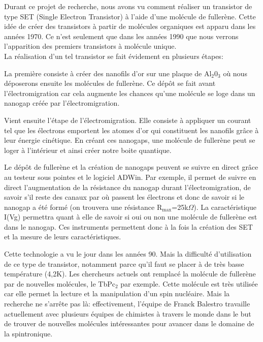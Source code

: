 Durant ce projet de recherche, nous avons vu comment réaliser un transistor de type SET (Single Electron Transistor) à l'aide d'une molécule de fullerène. Cette idée de créer des transistors à partir de molécules organiques est apparu dans les années 1970. Ce n'est seulement que dans les années 1990 que nous verrons l'apparition des premiers transistors à molécule unique.\\

La réalisation d'un tel transistor se fait évidement en plusieurs étapes:

La première consiste à créer des nanofils d'or sur une plaque de Al$_2$0$_3$ où nous déposerons ensuite les molécules de fullerène. Ce dépôt se fait avant l'électromigration car cela augmente les chances qu'une molécule se loge dans un nanogap créée par l'électromigration.

Vient ensuite l'étape de l'électromigration. Elle consiste à appliquer un courant tel que les électrons emportent les atomes d'or qui constituent les nanofils grâce à leur énergie cinétique. En créant ces nanogaps, une molécule de fullerène peut se loger à l'intérieur et ainsi créer notre boite quantique. 

Le dépôt de fullerène et la création de nanogaps peuvent se suivre en direct grâce au testeur sous pointes et le logiciel ADWin. Par exemple, il permet de suivre en direct l'augmentation de la résistance du nanogap durant l'électromigration, de savoir s'il reste des canaux par où passent les électrons et donc de savoir si le nanogap a été formé (on trouvera une résistance R$_\text{max}$=25k$\Omega$). La caractéristique I(Vg) permettra quant à elle de savoir si oui ou non une molécule de fullerène est dans le nanogap. Ces instruments permettent donc à la fois la création des SET et la mesure de leurs caractéristiques.

Cette technologie a vu le jour dans les années 90. Mais la difficulté d'utilisation de ce type de transistor, notamment parce qu'il faut se placer à de très basse température (4,2K). Les chercheurs actuels ont remplacé la molécule de fullerène par de nouvelles molécules, le TbPc$_2$ par exemple. Cette molécule est très utilisée car elle permet la lecture et la manipulation d'un spin nucléaire. Mais la recherche ne s'arrête pas là: effectivement, l'équipe de Franck Balestro travaille actuellement avec plusieurs équipes de chimistes à travers le monde dans le but de trouver de nouvelles molécules intéressantes pour avancer dans le domaine de la spintronique.

